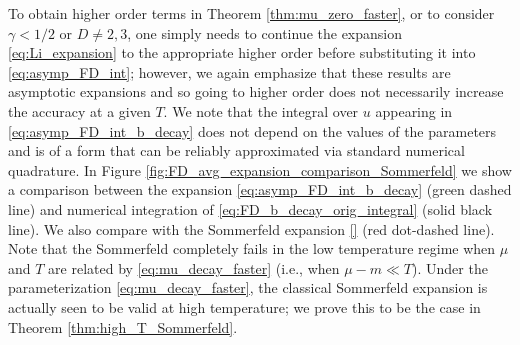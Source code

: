 \documentclass[sn-mathphys,Numbered]{sn-jnl}
\begin{document}
To obtain higher order terms in  Theorem \ref{thm:mu_zero_faster}, or to consider  $\gamma<1/2$ or $D\neq 2,3$, one simply needs to  continue the expansion \eqref{eq:Li_expansion} to the appropriate higher order before substituting it into \eqref{eq:asymp_FD_int}; however, we again emphasize that these results are asymptotic expansions and so going to higher order does not necessarily increase the accuracy at a given $T$. We note that the integral over $u$ appearing in \eqref{eq:asymp_FD_int_b_decay} does not depend on the values of the parameters and is of a form that can be  reliably approximated via standard numerical quadrature.  In Figure \ref{fig:FD_avg_expansion_comparison_Sommerfeld} we show a comparison between the expansion \eqref{eq:asymp_FD_int_b_decay} (green dashed line) and numerical integration of \eqref{eq:FD_b_decay_orig_integral} (solid black line).  We also compare with the Sommerfeld expansion \eqref{} (red dot-dashed line).  Note that the Sommerfeld completely fails in the low temperature regime when $\mu$ and $T$ are related by \eqref{eq:mu_decay_faster} (i.e., when $\mu-m\ll T$).  Under the parameterization \eqref{eq:mu_decay_faster}, the classical Sommerfeld expansion is actually seen to be valid at high temperature; we prove this to be the case in Theorem \ref{thm:high_T_Sommerfeld}.
\end{document}

